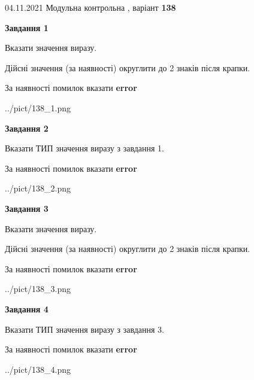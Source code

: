 \documentclass[11pt, ukrainian]{article}
\begin{document}
{04.11.2021 Модульна контрольна , варіант  \No \textbf { 138 }\par}
{
\begin {large}
{\begin {center}\textbf{Завдання 1}\end {center}}\par
Вказати значення виразу. \par
Дійсні значення (за наявності) округлити до 2 знаків після крапки. \par
За наявності помилок вказати \textbf{error}

\begin{center}
	{../pict/138_1.png}
\end{center}
\newpage

{\begin {center}\textbf{Завдання 2}\end {center}}\par
Вказати ТИП значення виразу з завдання 1. \par
За наявності помилок вказати \textbf{error}

\begin{center}
	{../pict/138_2.png}
\end{center}
\newpage

{\begin {center}\textbf{Завдання 3}\end {center}}\par
Вказати значення виразу. \par
Дійсні значення (за наявності) округлити до 2 знаків після крапки. \par
За наявності помилок вказати \textbf{error}

\begin{center}
	{../pict/138_3.png}
\end{center}
\newpage

{\begin {center}\textbf{Завдання 4}\end {center}}\par
Вказати ТИП значення виразу з завдання 3. \par
За наявності помилок вказати \textbf{error}

\begin{center}
	{../pict/138_4.png}
\end{center}
\newpage


\end{large}}
\end{document}
